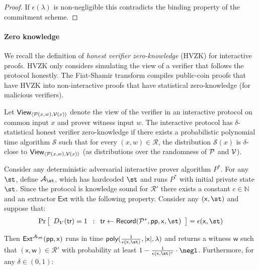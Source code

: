 \begin{proof}
If $\epsilon(\lambda)$ is non-negligible this contradicts the binding property of the commitment scheme.  
\end{proof} 


\paragraph{Zero knowledge} We recall the definition of \emph{honest verifier zero-knowledge} (HVZK) for interactive proofs. HVZK only considers simulating the view of a verifier that follows the protocol honestly. The Fiat-Shamir transform compiles public-coin proofs that have HVZK into non-interactive proofs that have statistical zero-knowledge (for malicious verifiers). 

\begin{definition}
\label{def:hvzk}
Let $\textsf{View}_{\langle \mathcal{P}(x, w), \mathcal{V}(x) \rangle}$ denote the view of the verifier in an interactive protocol on common input $x$ and prover witness input $w$. The interactive protocol has $\delta$-statistical honest verifier zero-knowledge if there exists a probabilistic polynomial time algorithm $\mathcal{S}$ such that for every $(x, w) \in \mathcal{R}$, the distribution $\mathcal{S}(x)$ is $\delta$-close to $\textsf{View}_{\langle \mathcal{P}(x, w), \mathcal{V}(x) \rangle}$ (as distributions over the randomness of $\mathcal{P}$ and $\mathcal{V}$).
\end{definition}

Consider any deterministic adversarial interactive prover algorithm $P^*$. For any $\st$, define $\mathcal{A}_{\st}$, which has hardcoded $\st$ and runs $P^*$ with initial private state $\st$. Since the protocol is knowledge sound for $\mathcal{R}'$ there exists a constant $c \in \mathbb{N}$ and an extractor $\mathsf{Ext}$ with the following property. Consider any $(\mathsf{x}, \st)$ and suppose that: 
$$\Pr \left[
\begin{array}{c} 
D_V(\tr) = 1 
\end{array} 
:
\begin{array}{c}
\textsf{tr} \leftarrow \textsf{Record}(\prover^*, \params, \mathsf{x}, \st)
\end{array}
\right] = \epsilon(\mathsf{x}, \st)
 $$ 
 
Then $\mathsf{Ext}^{\mathcal{A}_\st}(\params, \mathsf{x})$ runs in time $\textsf{poly}(\frac{1}{\epsilon(\mathsf{x}, \st)}, |\mathsf{x}|, \lambda)$ and returns a witness $\mathsf{w}$ such that $(\mathsf{x}, \mathsf{w}) \in \mathcal{R}'$ with probability at least $1 - \frac{1}{\epsilon(\mathsf{x}, \st)^c} \cdot \negl$. Furthermore, for any $\delta \in (0,1)$:

